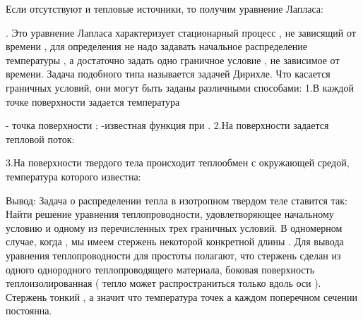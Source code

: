 Если отсутствуют и тепловые источники, то получим уравнение Лапласа:

 .
Это уравнение Лапласа характеризует стационарный процесс , не зависящий от времени , для определения   не надо задавать начальное распределение температуры , а достаточно задать одно граничное условие , не зависимое от времени. Задача подобного типа называется задачей Дирихле.
Что касается граничных условий, они могут быть заданы различными способами:
1.В каждой точке поверхности   задается температура
  
 - точка поверхности  ;
 -известная функция при  .
2.На поверхности   задается тепловой  поток:
 
 
3.На поверхности твердого тела происходит теплообмен с окружающей средой, температура   которого известна:
 
Вывод:
Задача о распределении тепла в изотропном твердом теле ставится так:
Найти решение уравнения теплопроводности, удовлетворяющее начальному условию и одному из перечисленных трех граничных условий.
В одномерном случае, когда  , мы имеем стержень некоторой конкретной длины  .
Для вывода уравнения теплопроводности для простоты полагают, что стержень сделан из одного однородного теплопроводящего материала, боковая поверхность теплоизолированная ( тепло может распространиться только вдоль оси  ). Стержень тонкий , а значит что температура точек а каждом поперечном сечении постоянна.

